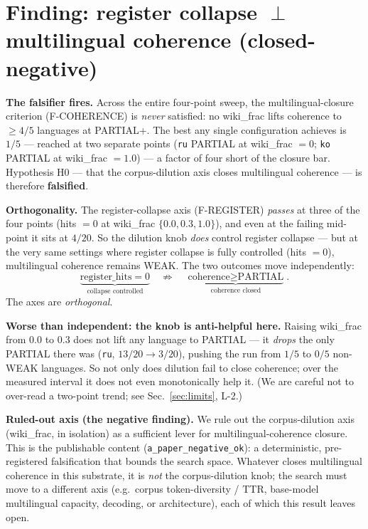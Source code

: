 \documentclass[11pt,a4paper]{article}
\begin{document}
\section{Finding: register collapse $\perp$ multilingual coherence (closed-negative)}
\label{sec:finding}

\textbf{The falsifier fires.} Across the entire four-point sweep, the
multilingual-closure criterion (F-COHERENCE) is \emph{never} satisfied:
no wiki\_frac lifts coherence to $\geq 4/5$ languages at PARTIAL+. The
best any single configuration achieves is $1/5$ --- reached at two
separate points (\texttt{ru} PARTIAL at wiki\_frac $=0$; \texttt{ko}
PARTIAL at wiki\_frac $=1.0$) --- a factor of four short of the closure
bar. Hypothesis H0 --- that the corpus-dilution axis closes multilingual
coherence --- is therefore \textbf{falsified}.

\medskip
\noindent\textbf{Orthogonality.} The register-collapse axis (F-REGISTER)
\emph{passes} at three of the four points (hits $=0$ at wiki\_frac
$\{0.0,0.3,1.0\}$), and even at the failing mid-point it sits at $4/20$.
So the dilution knob \emph{does} control register collapse --- but at the
very same settings where register collapse is fully controlled
(hits $=0$), multilingual coherence remains WEAK. The two outcomes move
independently:
\[
\underbrace{\text{register\_hits}=0}_{\text{collapse controlled}}
\quad\not\Rightarrow\quad
\underbrace{\text{coherence}\geq\text{PARTIAL}}_{\text{coherence closed}}.
\]
The axes are \emph{orthogonal}.

\medskip
\noindent\textbf{Worse than independent: the knob is anti-helpful here.}
Raising wiki\_frac from $0.0$ to $0.3$ does not lift any language to
PARTIAL --- it \emph{drops} the only PARTIAL there was (\texttt{ru},
$13/20\to3/20$), pushing the run from $1/5$ to $0/5$ non-WEAK languages.
So not only does dilution fail to close coherence; over the measured
interval it does not even monotonically help it. (We are careful not to
over-read a two-point trend; see Sec.~\ref{sec:limits}, L-2.)

\medskip
\noindent\textbf{Ruled-out axis (the negative finding).} We rule out the
corpus-dilution axis (wiki\_frac, in isolation) as a sufficient lever for
multilingual-coherence closure. This is the publishable content
(\verb|a_paper_negative_ok|): a deterministic, pre-registered falsification
that bounds the search space. Whatever closes multilingual coherence in
this substrate, it is \emph{not} the corpus-dilution knob; the search must
move to a different axis (e.g.\ corpus token-diversity / TTR, base-model
multilingual capacity, decoding, or architecture), each of which this
result leaves open.
\end{document}
